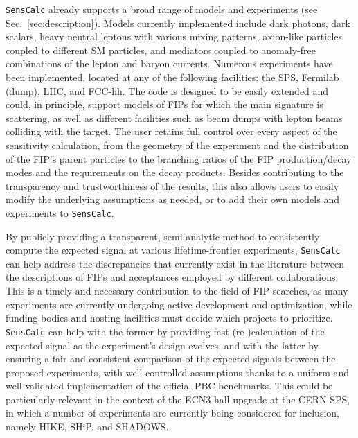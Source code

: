 \documentclass[
    aps,prd,
    twocolumn,
    nofootinbib,
    superscriptaddress,
]{revtex4}
\begin{document}
\texttt{SensCalc} already supports a broad range of models and experiments (see Sec.~\ref{sec:description}). Models currently implemented include dark photons, dark scalars, heavy neutral leptons with various mixing patterns, axion-like particles coupled to different SM particles, and mediators coupled to anomaly-free combinations of the lepton and baryon currents. Numerous experiments have been implemented, located at any of the following facilities: the SPS, Fermilab (dump), LHC, and FCC-hh. The code is designed to be easily extended and could, in principle, support models of FIPs for which the main signature is scattering, as well as different facilities such as beam dumps with lepton beams colliding with the target. The user retains full control over every aspect of the sensitivity calculation, from the geometry of the experiment and the distribution of the FIP's parent particles to the branching ratios of the FIP production/decay modes and the requirements on the decay products. Besides contributing to the transparency and trustworthiness of the results, this also allows users to easily modify the underlying assumptions as needed, or to add their own models and experiments to \texttt{SensCalc}.

By publicly providing a transparent, semi-analytic method to consistently compute the expected signal at various lifetime-frontier experiments, \texttt{SensCalc} can help address the discrepancies that currently exist in the literature between the descriptions of FIPs and acceptances employed by different collaborations.
This is a timely and necessary contribution to the field of FIP searches, as many experiments are currently undergoing active development and optimization, while funding bodies and hosting facilities must decide which projects to prioritize.
\texttt{SensCalc} can help with the former by providing fast (re-)calculation of the expected signal as the experiment's design evolves, and with the latter by ensuring a fair and consistent comparison of the expected signals between the proposed experiments, with well-controlled assumptions thanks to a uniform and well-validated implementation of the official PBC benchmarks. This could be particularly relevant in the context of the ECN3 hall upgrade at the CERN SPS, in which a number of experiments are currently being considered for inclusion, namely HIKE, SHiP, and SHADOWS.
\end{document}
